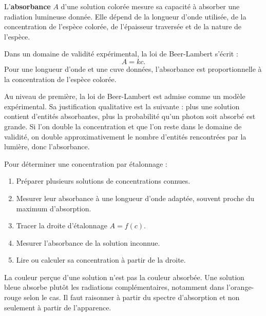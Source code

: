 \documentclass[11pt,a4paper]{article}
\begin{document}
\begin{definitionbox}
L'\textbf{absorbance} $A$ d'une solution colorée mesure sa capacité à absorber une radiation lumineuse donnée. Elle dépend de la longueur d'onde utilisée, de la concentration de l'espèce colorée, de l'épaisseur traversée et de la nature de l'espèce.
\end{definitionbox}

\begin{theorembox}
Dans un domaine de validité expérimental, la loi de Beer-Lambert s'écrit :
\[
A=k c.
\]
Pour une longueur d'onde et une cuve données, l'absorbance est proportionnelle à la concentration de l'espèce colorée.
\end{theorembox}

\begin{demobox}
Au niveau de première, la loi de Beer-Lambert est admise comme un modèle expérimental. Sa justification qualitative est la suivante : plus une solution contient d'entités absorbantes, plus la probabilité qu'un photon soit absorbé est grande. Si l'on double la concentration et que l'on reste dans le domaine de validité, on double approximativement le nombre d'entités rencontrées par la lumière, donc l'absorbance.
\end{demobox}

\begin{methodbox}
Pour déterminer une concentration par étalonnage :
\begin{enumerate}
\item Préparer plusieurs solutions de concentrations connues.
\item Mesurer leur absorbance à une longueur d'onde adaptée, souvent proche du maximum d'absorption.
\item Tracer la droite d'étalonnage $A=f(c)$.
\item Mesurer l'absorbance de la solution inconnue.
\item Lire ou calculer sa concentration à partir de la droite.
\end{enumerate}
\end{methodbox}

\begin{erreurbox}
La couleur perçue d'une solution n'est pas la couleur absorbée. Une solution bleue absorbe plutôt les radiations complémentaires, notamment dans l'orange-rouge selon le cas. Il faut raisonner à partir du spectre d'absorption et non seulement à partir de l'apparence.
\end{erreurbox}
\end{document}

